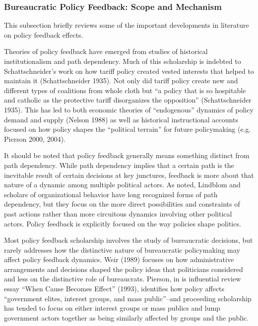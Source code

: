 \subsubsection{Bureaucratic Policy Feedback: Scope and Mechanism}

This subsection briefly reviews some of the important developments in literature on policy feedback effects. %

Theories of policy feedback have emerged from studies of historical institutionalism and path dependency. Much of this scholarship is indebted to Schattschneider's work on how tariff policy created vested interests that helped to maintain it (Schattschneider 1935). Not only did tariff policy create new and different types of coalitions from whole cloth but ``a policy that is so hospitable and catholic as the protective tariff disorganizes the opposition'' (Schattschneider 1935). This has led to both economic theories of ``endogenous'' dynamics of policy demand and supply (Nelson 1988) as well as historical instructional accounts focused on how policy shapes the ``political terrain'' for future policymaking (e.g. Pierson 2000, 2004). 

It should be noted that policy feedback generally means something distinct from path dependency. While path dependency implies that a certain path is the inevitable result of certain decisions at key junctures, feedback is more about that nature of a dynamic among multiple political actors. As noted, Lindblom and scholars of organizational behavior have long recognized forms of path dependency, but they focus on the more direct possibilities and constraints of past actions rather than more circuitous dynamics involving other political actors. Policy feedback is explicitly focused on the way policies shape politics. 

Most policy feedback scholarship involves the study of bureaucratic decisions, but rarely addresses how the distinctive nature of bureaucratic policymaking may affect policy feedback dynamics. Weir (1989) focuses on how administrative arrangements and decisions shaped the policy ideas that politicians considered and less on the distinctive role of bureaucrats. Pierson, in is influential review essay ``When Cause Becomes Effect'' (1993), identifies how policy affects ``government elites, interest groups, and mass public''--and proceeding scholarship has tended to focus on either interest groups or mass publics and lump government actors together as being similarly affected by groups and the public. 

